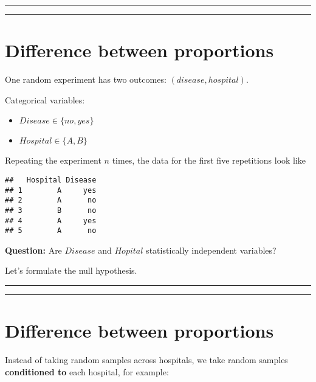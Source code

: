 \documentclass[
]{book}
\providecommand{\tightlist}{%
  \setlength{\itemsep}{0pt}\setlength{\parskip}{0pt}}
\begin{document}
\begin{center}\rule{0.5\linewidth}{0.5pt}\end{center}

\begin{center}\rule{0.5\linewidth}{0.5pt}\end{center}

\hypertarget{difference-between-proportions-1}{%
\section{Difference between proportions}\label{difference-between-proportions-1}}

One random experiment has two outcomes: \((disease, hospital)\).

Categorical variables:

\begin{itemize}
\tightlist
\item
  \(Disease \in\{no, yes\}\)
\item
  \(Hospital \in \{A,B\}\)
\end{itemize}

Repeating the experiment \(n\) times, the data for the first five repetitions look like

\begin{verbatim}
##   Hospital Disease
## 1        A     yes
## 2        A      no
## 3        B      no
## 4        A     yes
## 5        A      no
\end{verbatim}

\textbf{Question:} Are \(Disease\) and \(Hopital\) statistically independent variables?

Let's formulate the null hypothesis.

\begin{center}\rule{0.5\linewidth}{0.5pt}\end{center}

\begin{center}\rule{0.5\linewidth}{0.5pt}\end{center}

\hypertarget{difference-between-proportions-2}{%
\section{Difference between proportions}\label{difference-between-proportions-2}}

Instead of taking random samples across hospitals, we take random samples \textbf{conditioned to} each hospital, for example:
\end{document}
